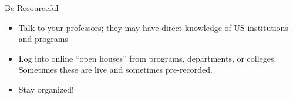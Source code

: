 \begin{frame}[fragile]{Be Resourceful}
\begin{itemize}
    \item Talk to your professors; they may have direct knowledge of US institutions and programs
    \item Log into online ``open houses'' from programs, departments, or colleges.  Sometimes these are live and sometimes pre-recorded.
    \item Stay organized!  
\end{itemize}
\end{frame}

